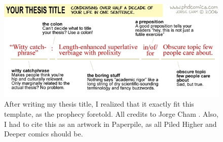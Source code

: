 \documentclass[12pt]{report}
\begin{document}
\begin{figure}[h!]
    \includegraphics[width=\textwidth]{phd-comics-718}
    \caption{After writing my thesis title, I realized that it exactly fit this template, as the prophecy foretold. All credits to Jorge Cham \cite{Cham2006-zx}. Also, I had to cite this as an artwork in Paperpile, as all Piled Higher and Deeper comics should be.}
\end{figure}
\end{document}
